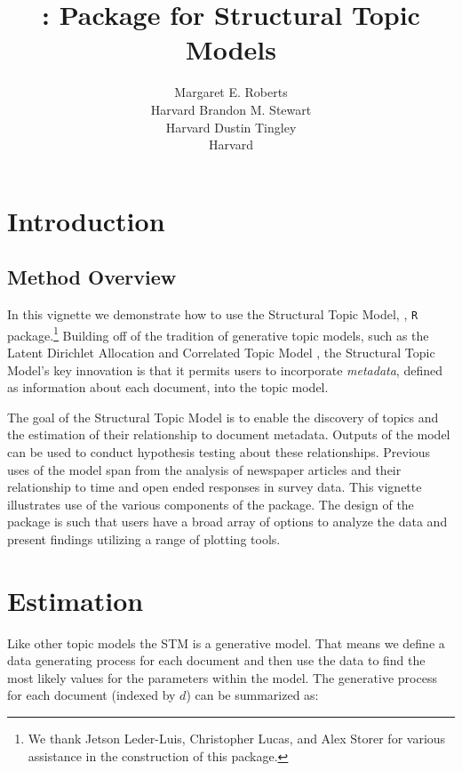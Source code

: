 \documentclass[nojss]{jss}
\author{\hspace{1.1in}Margaret E. Roberts\\\hspace{1.1in}Harvard \And
  \hspace{1.5in}Brandon M. Stewart\\\hspace{1.5in}Harvard \And
  \hspace{1.5in}Dustin Tingley\\\hspace{1.5in}Harvard \And
}
\title{\pkg{stm}: \proglang{R} Package for Structural Topic Models}
\newcommand\spacingset[1]{\renewcommand{\baselinestretch}{#1}\small\normalsize}
\begin{document}

\spacingset{1.5}

\section{Introduction}
\subsection{Method Overview}

In this vignette we demonstrate how to use the Structural Topic Model, , \texttt{R} package.\footnote{We thank Jetson Leder-Luis, Christopher Lucas, and Alex Storer for various assistance in the construction of this package.} Building off of the tradition of generative topic models, such as the Latent Dirichlet Allocation \citep{blei2003latent} and Correlated Topic Model \citep{blei2007correlated}, the Structural Topic Model's key innovation is that it permits users to incorporate \emph{metadata}, defined as information about each document, into the topic model.

The goal of the Structural Topic Model is to enable the discovery of topics and the estimation of their relationship to document metadata. Outputs of the model can be used to conduct hypothesis testing about these relationships. Previous uses of the model span from the analysis of newspaper articles and their relationship to time and open ended responses in survey data. This vignette illustrates use of the various components of the package. The design of the package is such that users have a broad array of options to analyze the data and present findings utilizing a range of plotting tools.

\section{Estimation}
Like other topic models the STM is a generative model. That means we define a data generating process for each document and then use the data to find the most likely values for the parameters within the model.  The generative process for each document (indexed by $d$) can be summarized as:
\end{document}
